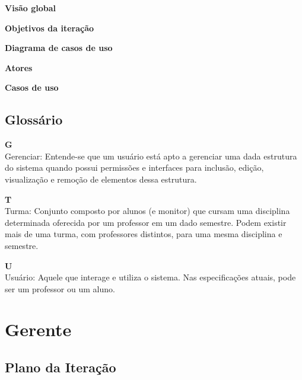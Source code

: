 \documentclass[12pt,letterpaper]{article}
\begin{document}
\vspace{1cm}
{\large {\bf Visão global}}
\vspace{0.5cm}

\pagebreak

\vspace{1cm}
{\large {\bf Objetivos da iteração}}
\vspace{0.5cm}

\pagebreak

\vspace{1cm}
{\large {\bf Diagrama de casos de uso}}
\vspace{0.5cm}

\pagebreak

\vspace{1cm}
{\large {\bf Atores}}
\vspace{0.5cm}

\pagebreak

\vspace{1cm}
{\large {\bf Casos de uso}}
\vspace{0.5cm}

\pagebreak

\subsection{Glossário}

  {\bf G}\\
    Gerenciar: Entende-se que um usuário está apto a gerenciar uma dada
  estrutura do sistema quando possui permissões e interfaces para inclusão,
  edição, visualização e remoção de elementos dessa estrutura. 
    
  {\bf T}\\
    Turma: Conjunto composto por alunos (e monitor) que cursam uma disciplina 
    determinada oferecida por um professor em um dado semestre. Podem
    existir mais de uma turma, com professores distintos, para uma mesma 
    disciplina e semestre.  
    
  {\bf U}\\
    Usuário: Aquele que interage e utiliza o sistema. Nas especificações
    atuais, pode ser um professor ou um aluno.


\pagebreak
\section{Gerente}

\subsection{Plano da Iteração}
\end{document}
